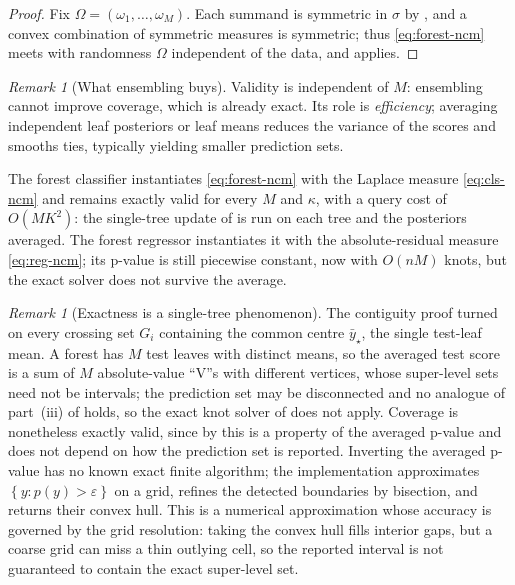 \documentclass[twoside]{article}
\numberwithin{equation}{section}
\theoremstyle{plain}
\theoremstyle{definition}
\theoremstyle{remark}
\newtheorem{remark}[theorem]{Remark}
\newcommand{\set}[1]{\left\{#1\right\}}
\begin{document}
\begin{proof}
Fix $\Omega = (\omega_1, \dots, \omega_{M})$. Each summand is symmetric in
$\sigma$ by , and a convex combination of symmetric
measures is symmetric; thus \eqref{eq:forest-ncm} meets 
with randomness $\Omega$ independent of the data, and 
applies.
\end{proof}

\begin{remark}[What ensembling buys]\label{rem:forest-efficiency}
Validity is independent of $M$: ensembling cannot improve coverage, which is
already exact. Its role is \emph{efficiency}; averaging independent leaf
posteriors or leaf means reduces the variance of the scores and smooths ties,
typically yielding smaller prediction sets.
\end{remark}

The forest classifier instantiates \eqref{eq:forest-ncm} with the Laplace measure
\eqref{eq:cls-ncm} and remains exactly valid for every $M$ and $\kappa$,
with a query cost of $O(M K^2)$: the single-tree update of
 is run on each tree and the posteriors averaged. The forest
regressor instantiates it with the absolute-residual measure \eqref{eq:reg-ncm};
its p-value is still piecewise constant, now with $O(n M)$ knots, but
the exact solver does not survive the average.

\begin{remark}[Exactness is a single-tree phenomenon]\label{rem:forest-exactness}
The contiguity proof turned on every crossing set $G_i$ containing the common centre
$\bar{y}_{\star}$, the single test-leaf mean. A forest has $M$ test
leaves with distinct means, so the averaged test score is a sum of $M$
absolute-value ``V''s with different vertices, whose super-level sets need not be
intervals; the prediction set may be disconnected and no analogue of
part~(iii) of  holds, so the exact knot solver of 
does not apply. Coverage is nonetheless exactly valid, since by
 this is a property of the averaged p-value and does not
depend on how the prediction set is reported. Inverting the averaged p-value has no
known exact finite algorithm; the implementation approximates
$\set{y : p(y) > \varepsilon}$ on a grid, refines the detected boundaries by bisection,
and returns their convex hull. This is a numerical approximation whose accuracy is
governed by the grid resolution: taking the convex hull fills interior gaps, but a
coarse grid can miss a thin outlying cell, so the reported interval is not guaranteed
to contain the exact super-level set.
\end{remark}
\end{document}
